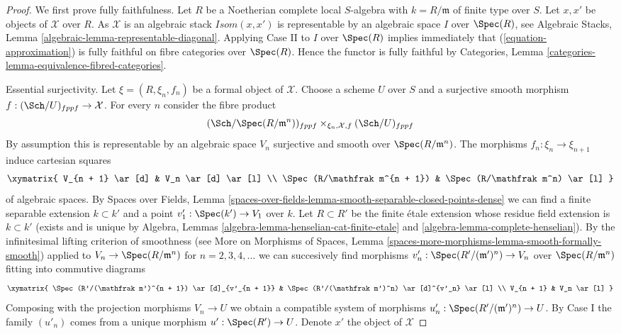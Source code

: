 \begin{proof}
\medskip\noindent
We first prove fully faithfulness. Let $R$ be a Noetherian complete
local $S$-algebra with $k = R/\mathfrak m$ of finite type over $S$.
Let $x, x'$ be objects of $\mathcal{X}$ over $R$. As $\mathcal{X}$ is
an algebraic stack $\mathit{Isom}(x, x')$ is representable by an
algebraic space $I$ over $\Spec(R)$, see
Algebraic Stacks, Lemma \ref{algebraic-lemma-representable-diagonal}.
Applying Case II to $I$ over $\Spec(R)$ implies immediately that
(\ref{equation-approximation}) is fully faithful on fibre categories over
$\Spec(R)$. Hence the functor is fully faithful by
Categories, Lemma \ref{categories-lemma-equivalence-fibred-categories}.

\medskip\noindent
Essential surjectivity. Let $\xi = (R, \xi_n, f_n)$ be a formal object of
$\mathcal{X}$. Choose a scheme $U$ over $S$ and a surjective smooth morphism
$f : (\Sch/U)_{fppf} \to \mathcal{X}$. For every $n$ consider the fibre product
$$
(\Sch/\Spec(R/\mathfrak m^n))_{fppf}
\times_{\xi_n, \mathcal{X}, f}
(\Sch/U)_{fppf}
$$
By assumption this is representable by an algebraic space $V_n$ surjective and
smooth over $\Spec(R/\mathfrak m^n)$. The morphisms
$f_n : \xi_n \to \xi_{n + 1}$ induce cartesian squares
$$
\xymatrix{
V_{n + 1} \ar[d] & V_n \ar[d] \ar[l] \\
\Spec(R/\mathfrak m^{n + 1}) & \Spec(R/\mathfrak m^n) \ar[l]
}
$$
of algebraic spaces. By Spaces over Fields, Lemma
\ref{spaces-over-fields-lemma-smooth-separable-closed-points-dense}
we can find a finite separable extension $k \subset k'$ and a point
$v'_1 : \Spec(k') \to V_1$ over $k$. Let $R \subset R'$ be the finite \'etale
extension whose residue field extension is $k \subset k'$ (exists and
is unique by
Algebra, Lemmas \ref{algebra-lemma-henselian-cat-finite-etale} and
\ref{algebra-lemma-complete-henselian}).
By the infinitesimal lifting criterion of smoothness (see
More on Morphisms of Spaces, Lemma
\ref{spaces-more-morphisms-lemma-smooth-formally-smooth})
applied to $V_n \to \Spec(R/\mathfrak m^n)$ for $n = 2, 3, 4, \ldots$
we can succesively find morphisms
$v'_n : \Spec(R'/(\mathfrak m')^n) \to V_n$ over $\Spec(R/\mathfrak m^n)$
fitting into commutive diagrams
$$
\xymatrix{
\Spec(R'/(\mathfrak m')^{n + 1}) \ar[d]_{v'_{n + 1}} &
\Spec(R'/(\mathfrak m')^n) \ar[d]^{v'_n} \ar[l] \\
V_{n + 1} & V_n \ar[l]
}
$$
Composing with the projection morphisms $V_n \to U$ we obtain a compatible
system of morphisms $u'_n : \Spec(R'/(\mathfrak m')^n) \to U$.
By Case I the family $(u'_n)$ comes from a unique
morphism $u' : \Spec(R') \to U$. Denote $x'$ the object of $\mathcal{X}$

\end{proof}
